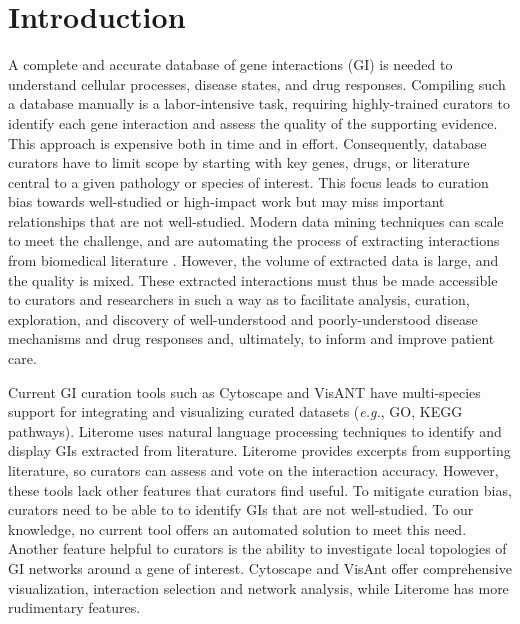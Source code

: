 \documentclass{ws-procs11x85}
\begin{document}


\bodymatter

\section{Introduction}
\label{sec:introduction}
A complete and accurate database of gene interactions (GI) is needed to understand cellular processes, disease states, and drug responses. Compiling such a database manually is a labor-intensive task, requiring highly-trained curators to identify each gene interaction and assess the quality of the supporting evidence. This approach is expensive both in time and in effort. Consequently, database curators have to limit scope by starting with key genes, drugs, or literature central to a given pathology or species of interest. This focus leads to curation bias towards well-studied or high-impact work but may miss important relationships that are not well-studied. Modern data mining techniques can scale to meet the challenge, and are automating the process of extracting interactions from biomedical literature \cite{Tari2010,Vazquez2011,Percha2012,Poon2015,em2016,Davis2017}. However, the volume of extracted data is large, and the quality is mixed.  These extracted interactions must thus be made accessible to curators and researchers in such a way as to facilitate analysis, curation, exploration, and discovery of well-understood and poorly-understood disease mechanisms and drug responses and, ultimately, to inform and improve patient care.

Current GI curation tools such as Cytoscape\cite{Shannon2003} and VisANT\cite{Hu2004} have multi-species support for integrating and visualizing curated datasets (\textit{e.g.}, GO, KEGG pathways). Literome\cite{Poon2014} uses natural language processing techniques to identify and display GIs extracted from literature. Literome provides excerpts from supporting literature, so curators can assess and vote on the interaction accuracy. However, these tools lack other features that curators find useful. To mitigate curation bias, curators need to be able to to identify GIs that are not well-studied. To our knowledge, no current tool offers an automated solution to meet this need. Another feature helpful to curators is the ability to investigate local topologies of GI networks around a gene of interest. Cytoscape and VisAnt offer comprehensive visualization, interaction selection and network analysis, while Literome has more rudimentary features.
\end{document}

